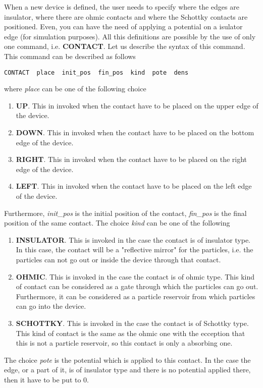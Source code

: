 \documentclass[12pt]{book}
\begin{document}
When a new device is defined, the user needs to specify where the edges are insulator, where there are ohmic contacts and where the Schottky contacts are positioned. Even, you can have the need of applying a potential on a isulator edge (for simulation purposes). All this definitions are possible by the use of only one command, i.e. \textbf{CONTACT}. Let us describe the syntax of this command.\\
This command can be described as follows
\begin{verbatim}
CONTACT  place  init_pos  fin_pos  kind  pote  dens
\end{verbatim}
where \textsl{place} can be one of the following choice
\begin{enumerate}
\item
\textbf{UP}. This in invoked when the contact have to be placed on the upper edge of the device.
\item
\textbf{DOWN}. This in invoked when the contact have to be placed on the bottom edge of the device.
\item
\textbf{RIGHT}. This in invoked when the contact have to be placed on the right edge of the device.
\item
\textbf{LEFT}. This in invoked when the contact have to be placed on the left edge of the device.
\end{enumerate}
Furthermore, \textsl{init\_pos} is the initial position of the contact, \textsl{fin\_pos} is the final position of the same contact.
The choice \textsl{kind} can be one of the following
\begin{enumerate}
\item
\textbf{INSULATOR}. This is invoked in the case the contact is of insulator type. In this case, the contact will be a "reflective mirror" for the particles, i.e. the particles can not go out or inside the device through that contact.
\item
\textbf{OHMIC}. This is invoked in the case the contact is of ohmic type. This kind of contact can be considered as a gate through which the particles can go out. Furthermore, it can be considered as a particle reservoir from which particles can go into the device.
\item
\textbf{SCHOTTKY}. This is invoked in the case the contact is of Schottky type. This kind of contact is the same as the ohmic one with the ecception that this is not a particle reservoir, so this contact is only a absorbing one.
\end{enumerate}
The choice \textsl{pote} is the potential which is applied to this contact. In the case the edge, or a part of it, is of insulator type and there is no potential applied there, then it have to be put to 0.\\
\end{document}
